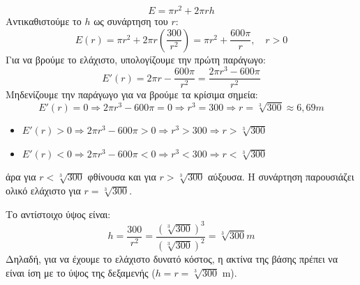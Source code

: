 \[ E = \pi r^2 + 2\pi r h \]
Αντικαθιστούμε το $h$ ως συνάρτηση του $r$:
\[ E(r) = \pi r^2 + 2\pi r \left(\frac{300}{r^2}\right) = \pi r^2 + \frac{600\pi}{r}, \quad r > 0 \]
Για να βρούμε το ελάχιστο, υπολογίζουμε την πρώτη παράγωγο:
\[ E'(r) = 2\pi r - \frac{600\pi}{r^2} = \frac{2\pi r^3 - 600\pi}{r^2} \]
Μηδενίζουμε την παράγωγο για να βρούμε τα κρίσιμα σημεία:
\[ E'(r) = 0 \Rightarrow 2\pi r^3 - 600\pi = 0 \Rightarrow r^3 = 300 \Rightarrow r = \sqrt[3]{300} \approx 6{,}69 \si{m} \]
\begin{itemize}
\item $E'(r) > 0 \Rightarrow 2\pi r^3 - 600\pi > 0 \Rightarrow r^3 > 300 \Rightarrow r > \sqrt[3]{300}$
\item $E'(r) < 0 \Rightarrow 2\pi r^3 - 600\pi < 0 \Rightarrow r^3 < 300 \Rightarrow r < \sqrt[3]{300}$
\end{itemize}
άρα για $r < \sqrt[3]{300}$ φθίνουσα και για $r > \sqrt[3]{300}$ αύξουσα. Η συνάρτηση παρουσιάζει ολικό ελάχιστο για $r = \sqrt[3]{300}$.
\begin{center}
\qquad
{}
\end{center}
Το αντίστοιχο ύψος είναι:
\[ h = \frac{300}{r^2} = \frac{(\sqrt[3]{300})^3}{(\sqrt[3]{300})^2} = \sqrt[3]{300} \si{m} \]
Δηλαδή, για να έχουμε το ελάχιστο δυνατό κόστος, η ακτίνα της βάσης πρέπει να είναι ίση με το ύψος της δεξαμενής ($h = r = \sqrt[3]{300}$ \si{m}).\\


